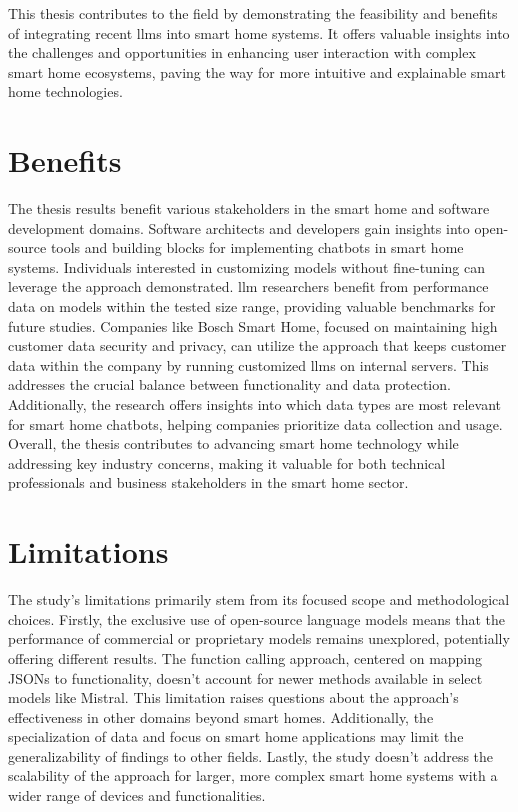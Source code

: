 This thesis contributes to the field by demonstrating the feasibility and benefits of integrating recent \glspl{llm} into smart home systems. It offers valuable insights into the challenges and opportunities in enhancing user interaction with complex smart home ecosystems, paving the way for more intuitive and explainable smart home technologies.

\section{Benefits}
The thesis results benefit various stakeholders in the smart home and software development domains. Software architects and developers gain insights into open-source tools and building blocks for implementing chatbots in smart home systems. Individuals interested in customizing models without fine-tuning can leverage the approach demonstrated. 
\gls{llm} researchers benefit from performance data on models within the tested size range, providing valuable benchmarks for future studies. 
Companies like Bosch Smart Home, focused on maintaining high customer data security and privacy, can utilize the approach that keeps customer data within the company by running customized \glspl{llm} on internal servers. 
This addresses the crucial balance between functionality and data protection. Additionally, the research offers insights into which data types are most relevant for smart home chatbots, helping companies prioritize data collection and usage. 
Overall, the thesis contributes to advancing smart home technology while addressing key industry concerns, making it valuable for both technical professionals and business stakeholders in the smart home sector.

\section{Limitations}
The study's limitations primarily stem from its focused scope and methodological choices. 
Firstly, the exclusive use of open-source language models means that the performance of commercial or proprietary models remains unexplored, potentially offering different results. 
The function calling approach, centered on mapping JSONs to functionality, doesn't account for newer methods available in select models like Mistral. This limitation raises questions about the approach's effectiveness in other domains beyond smart homes. 
Additionally, the specialization of data and focus on smart home applications may limit the generalizability of findings to other fields. 
Lastly, the study doesn't address the scalability of the approach for larger, more complex smart home systems with a wider range of devices and functionalities.

